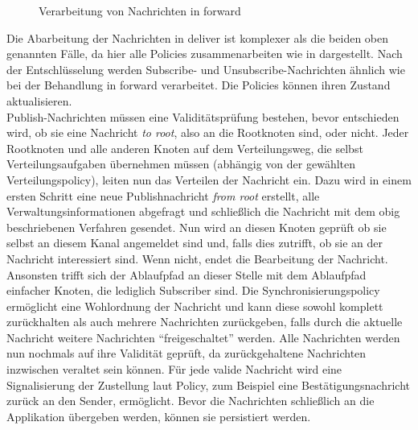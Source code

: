 \begin{figure}[htbp]
\centering
{}
\caption{Verarbeitung von Nachrichten in forward}
\label{fig:processing_forward}
\end{figure}

Die Abarbeitung der Nachrichten in deliver ist komplexer als die beiden oben genannten Fälle, da hier alle Policies zusammenarbeiten wie in  dargestellt. Nach der Entschlüsselung werden Subscribe- und Unsubscribe-Nachrichten ähnlich wie bei der Behandlung in forward verarbeitet. Die Policies können ihren Zustand aktualisieren.\\
Publish-Nachrichten müssen eine Validitätsprüfung bestehen, bevor entschieden wird, ob sie eine Nachricht \emph{to root}, also an die Rootknoten sind, oder nicht. Jeder Rootknoten und alle anderen Knoten auf dem Verteilungsweg, die selbst Verteilungsaufgaben übernehmen müssen (abhängig von der gewählten Verteilungspolicy), leiten nun das Verteilen der Nachricht ein. Dazu wird in einem ersten Schritt eine neue Publishnachricht \emph{from root} erstellt, alle Verwaltungsinformationen abgefragt und schließlich die Nachricht mit dem obig beschriebenen Verfahren gesendet. Nun wird an diesen Knoten geprüft ob sie selbst an diesem Kanal angemeldet sind und, falls dies zutrifft, ob sie an der Nachricht interessiert sind. Wenn nicht, endet die Bearbeitung der Nachricht. Ansonsten trifft sich der Ablaufpfad an dieser Stelle mit dem Ablaufpfad einfacher Knoten, die lediglich Subscriber sind. Die Synchronisierungspolicy ermöglicht eine Wohlordnung der Nachricht und kann diese sowohl komplett zurückhalten als auch mehrere Nachrichten zurückgeben, falls durch die aktuelle Nachricht weitere Nachrichten ``freigeschaltet'' werden. Alle Nachrichten werden nun nochmals auf ihre Validität geprüft, da zurückgehaltene Nachrichten inzwischen veraltet sein können. Für jede valide Nachricht wird eine Signalisierung der Zustellung laut Policy, zum Beispiel eine Bestätigungsnachricht zurück an den Sender, ermöglicht. Bevor die Nachrichten schließlich an die Applikation übergeben werden, können sie persistiert werden.

